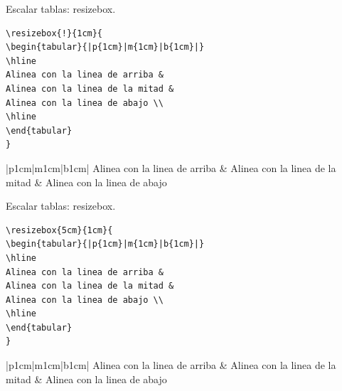 \documentclass[dvipsnames,xcolor, handout]{beamer}
\theoremstyle{plain}
\theoremstyle{definition}
\begin{document}
\begin{frame}[fragile]{Escalar tablas: resizebox.}
\begin{minipage}{0.6\linewidth}
\footnotesize
\begin{verbatim}
\resizebox{!}{1cm}{
\begin{tabular}{|p{1cm}|m{1cm}|b{1cm}|}
\hline
Alinea con la linea de arriba & 
Alinea con la linea de la mitad &
Alinea con la linea de abajo \\
\hline
\end{tabular}
}
\end{verbatim}
\end{minipage}\pause

\begin{minipage}{0.49\linewidth}
\footnotesize
\centering
\begin{tabular}{|p{1cm}|m{1cm}|b{1cm}|}
\hline
Alinea con la linea de arriba & 
Alinea con la linea de la mitad &
Alinea con la linea de abajo \\
\hline
\end{tabular}
\end{minipage}
\begin{minipage}{0.49\linewidth}
\footnotesize
\centering
{}
\end{minipage}
\end{frame}

\begin{frame}[fragile]{Escalar tablas: resizebox.}
\begin{minipage}{0.6\linewidth}
\footnotesize
\begin{verbatim}
\resizebox{5cm}{1cm}{
\begin{tabular}{|p{1cm}|m{1cm}|b{1cm}|}
\hline
Alinea con la linea de arriba & 
Alinea con la linea de la mitad &
Alinea con la linea de abajo \\
\hline
\end{tabular}
}
\end{verbatim}
\end{minipage}\pause

\begin{minipage}{0.49\linewidth}
\footnotesize
\centering
\begin{tabular}{|p{1cm}|m{1cm}|b{1cm}|}
\hline
Alinea con la linea de arriba & 
Alinea con la linea de la mitad &
Alinea con la linea de abajo \\
\hline
\end{tabular}
\end{minipage}
\begin{minipage}{0.49\linewidth}
\footnotesize
\centering
{}
\end{minipage}
\end{frame}
\end{document}
